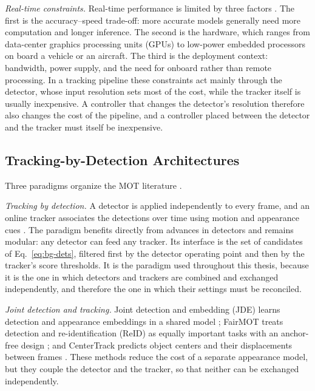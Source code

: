 \emph{Real-time constraints.} Real-time performance is limited by three factors \cite{bakirci2025lowpower,ismail2026realtime}. The first is the accuracy--speed trade-off: more accurate models generally need more computation and longer inference. The second is the hardware, which ranges from data-center graphics processing units (GPUs) to low-power embedded processors on board a vehicle or an aircraft. The third is the deployment context: bandwidth, power supply, and the need for onboard rather than remote processing. In a tracking pipeline these constraints act mainly through the detector, whose input resolution sets most of the cost, while the tracker itself is usually inexpensive. A controller that changes the detector's resolution therefore also changes the cost of the pipeline, and a controller placed between the detector and the tracker must itself be inexpensive.

\subsection{Tracking-by-Detection Architectures}\label{sec:bg-paradigms}
Three paradigms organize the MOT literature \cite{ismail2026realtime,adzemovic2026survey}.

\emph{Tracking by detection.} A detector is applied independently to every frame, and an online tracker associates the detections over time using motion and appearance cues \cite{bewley2016sort,wojke2017deepsort}. The paradigm benefits directly from advances in detectors and remains modular: any detector can feed any tracker. Its interface is the set of candidates of Eq.~\eqref{eq:bg-dets}, filtered first by the detector operating point and then by the tracker's score thresholds. It is the paradigm used throughout this thesis, because it is the one in which detectors and trackers are combined and exchanged independently, and therefore the one in which their settings must be reconciled.

\emph{Joint detection and tracking.} Joint detection and embedding (JDE) learns detection and appearance embeddings in a shared model \cite{wang2020jde}; FairMOT treats detection and re-identification (ReID) as equally important tasks with an anchor-free design \cite{zhang2021fairmot}; and CenterTrack predicts object centers and their displacements between frames \cite{zhou2020centertrack}. These methods reduce the cost of a separate appearance model, but they couple the detector and the tracker, so that neither can be exchanged independently.

